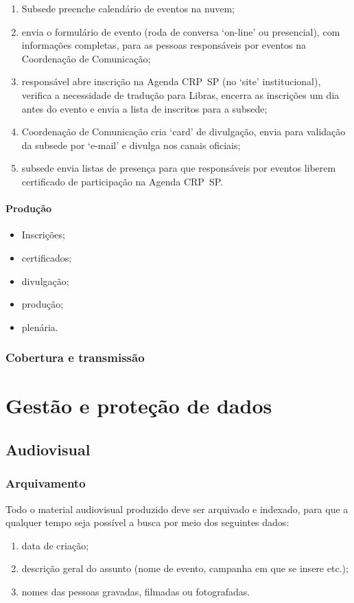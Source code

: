 \begin{enumerate}
	\def\labelenumi{\arabic{enumi}.}
	\item
	Subsede preenche calendário de eventos na nuvem;
	\item
	envia o formulário de evento (roda de conversa `on-line' ou   presencial), com informações completas, para as pessoas responsáveis por eventos na Coordenação de Comunicação;
	\item
	responsável abre inscrição na Agenda CRP~SP (no `site'  institucional), verifica a necessidade de tradução para Libras, encerra as inscrições um dia antes do evento e envia a lista de inscritos para a subsede;
	\item
	Coordenação de Comunicação cria `card' de divulgação, envia para validação da subsede por `e-mail' e divulga nos canais oficiais;
	\item
	subsede envia listas de presença para que responsáveis por eventos liberem certificado de participação na Agenda CRP~SP.
\end{enumerate}

\paragraph{Produção}

\begin{itemize}
	\item
	Inscrições;
	\item
	certificados;
	\item
	divulgação;
	\item
	produção;
	\item
	plenária.
\end{itemize}

\subsubsection{Cobertura e transmissão}

\section{Gestão e proteção de
	dados}

\subsection{Audiovisual}

\subsubsection{Arquivamento}

Todo o material audiovisual produzido deve ser arquivado e indexado, para que a qualquer tempo seja possível a busca por meio dos seguintes dados:

\begin{enumerate}
	\def\labelenumi{\arabic{enumi}.}
	\item
	data de criação;
	\item
	descrição geral do assunto (nome de evento, campanha em que se insere  etc.);
	\item
	nomes das pessoas gravadas, filmadas ou fotografadas.
\end{enumerate}